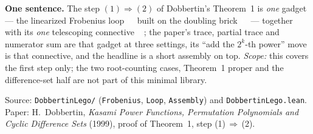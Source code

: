 \documentclass[11pt]{article}
\newcommand{\bF}{{\colorbox{faceF}{\textcolor{white}{\scriptsize\bfseries F}}}}
\newcommand{\bL}{{\colorbox{faceL}{\textcolor{white}{\scriptsize\bfseries L}}}}
\newcommand{\bT}{{\colorbox{conn}{\textcolor{white}{\scriptsize\bfseries T}}}}
\newcommand{\lc}[1]{\texttt{\small #1}}
\begin{document}
\begin{note}
\textbf{One sentence.} The step $(1)\Rightarrow(2)$ of Dobbertin's Theorem~1 is
\emph{one} gadget --- the linearized Frobenius loop \bL\ built on the doubling
brick \bF\ --- together with its \emph{one} telescoping connective \bT; the
paper's trace, partial trace and numerator sum are that gadget at three settings,
its ``add the $2^k$-th power'' move is that connective, and the headline is a
short assembly on top. \emph{Scope:} this covers the first step only; the two
root-counting cases, Theorem~1 proper and the difference-set half are not part of
this minimal library.
\end{note}

\vfill
\begin{center}\scriptsize
Source: \lc{DobbertinLego/} (\lc{Frobenius}, \lc{Loop}, \lc{Assembly}) and
\lc{DobbertinLego.lean}. Paper: H.~Dobbertin, \emph{Kasami Power Functions,
Permutation Polynomials and Cyclic Difference Sets} (1999), proof of Theorem~1,
step (1)\,$\Rightarrow$\,(2).
\end{center}
\end{document}
